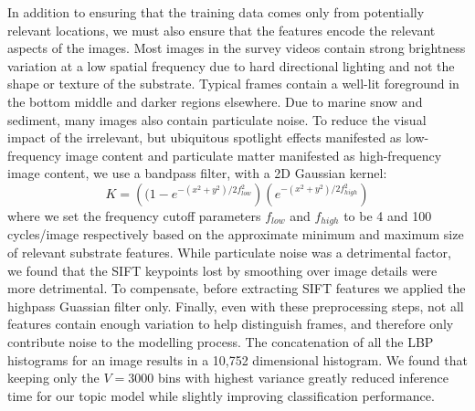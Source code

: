 In addition to ensuring that the training data comes only from potentially relevant locations, we must also ensure that the features encode the relevant aspects of the images.
Most images in the survey videos contain strong brightness variation at a low spatial frequency due to hard directional lighting and not the shape or texture of the substrate. Typical frames contain a well-lit foreground in the bottom middle and darker regions elsewhere. Due to marine snow and sediment, many images also contain particulate noise.
To reduce the visual impact of the irrelevant, but ubiquitous spotlight effects manifested as low-frequency image content and particulate matter manifested as high-frequency image content, we use a bandpass filter, with a 2D Gaussian kernel:
\begin{equation}
K = \left((1-e^{-(x^2+y^2)/2f_{low}^2}\right) \left(e^{-(x^2+y^2)/2f_{high}^2}\right)
\end{equation} 
where we set the frequency cutoff parameters $f_{low}$ and $f_{high}$ to be 4 and 100 cycles/image respectively based on the approximate minimum and maximum size of relevant substrate features. While particulate noise was a detrimental factor, we found that the SIFT keypoints lost by smoothing over image details were more detrimental. To compensate, before extracting SIFT features we applied the highpass Guassian filter only. Finally, even with these preprocessing steps, not all features contain enough variation to help distinguish frames, and therefore only contribute noise to the modelling process. The concatenation of all the LBP histograms for an image results in a 10,752 dimensional histogram. We found that keeping only the $V = 3000$ bins with highest variance greatly reduced inference time for our topic model while slightly improving classification performance.

